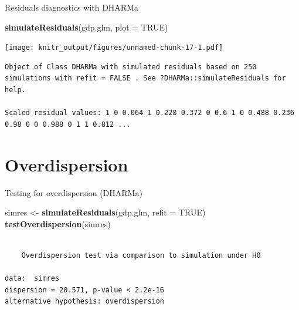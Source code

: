 \documentclass[10pt,ignorenonframetext,]{beamer}
\newenvironment{Shaded}{\begin{snugshade}}{\end{snugshade}}
\newcommand{\KeywordTok}[1]{\textcolor[rgb]{0.13,0.29,0.53}{\textbf{{#1}}}}
\newcommand{\DataTypeTok}[1]{\textcolor[rgb]{0.13,0.29,0.53}{{#1}}}
\newcommand{\StringTok}[1]{\textcolor[rgb]{0.31,0.60,0.02}{{#1}}}
\newcommand{\OtherTok}[1]{\textcolor[rgb]{0.56,0.35,0.01}{{#1}}}
\newcommand{\NormalTok}[1]{{#1}}
\begin{document}
\begin{frame}[fragile]{Residuals diagnostics with DHARMa}

\begin{Shaded}
\begin{Highlighting}[]
\KeywordTok{simulateResiduals}\NormalTok{(gdp.glm, }\DataTypeTok{plot =} \OtherTok{TRUE}\NormalTok{)}
\end{Highlighting}
\end{Shaded}

\texttt{[image: knitr\_output/figures/unnamed-chunk-17-1.pdf]}

\begin{verbatim}
Object of Class DHARMa with simulated residuals based on 250 simulations with refit = FALSE . See ?DHARMa::simulateResiduals for help. 
 
Scaled residual values: 1 0 0.064 1 0.228 0.372 0 0.6 1 0 0.488 0.236 0.98 0 0 0.988 0 1 1 0.812 ...
\end{verbatim}

\end{frame}

\section{Overdispersion}\label{overdispersion}

\begin{frame}[fragile]{Testing for overdispersion (DHARMa)}

\begin{Shaded}
\begin{Highlighting}[]
\NormalTok{simres <-}\StringTok{ }\KeywordTok{simulateResiduals}\NormalTok{(gdp.glm, }\DataTypeTok{refit =} \OtherTok{TRUE}\NormalTok{)}
\KeywordTok{testOverdispersion}\NormalTok{(simres)}
\end{Highlighting}
\end{Shaded}

\begin{verbatim}

    Overdispersion test via comparison to simulation under H0

data:  simres
dispersion = 20.571, p-value < 2.2e-16
alternative hypothesis: overdispersion
\end{verbatim}

\end{frame}
\end{document}
